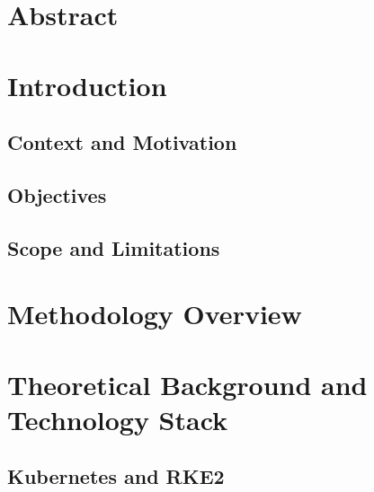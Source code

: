 \documentclass[12pt]{article}
\begin{document}
\tableofcontents
\newpage
\listoffigures
\newpage
\listoftables
\newpage

\section*{Abstract}

\newpage
{}

\section{Introduction}
\subsection{Context and Motivation}

\subsection{Objectives}

\subsection{Scope and Limitations}

\section{Methodology Overview}

\section{Theoretical Background and Technology Stack}
\subsection{Kubernetes and RKE2}
\end{document}
